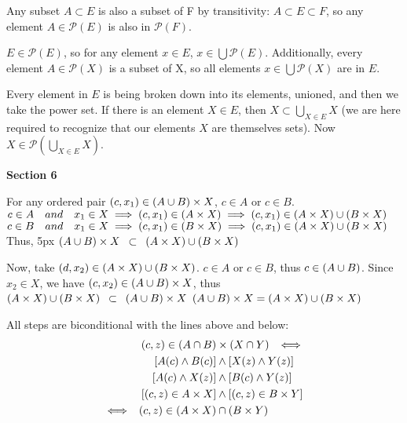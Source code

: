 \documentclass{article}
\DeclarePairedDelimiter\prn{(}{)}
\newcommand{\nl}[0]{\newline}
\newcommand{\rimp}[1][5]{\kern#1px \Longrightarrow \kern#1px}
\newcommand{\cimp}[1][5]{\kern#1px \iff \kern#1px}
\begin{document}
\begin{flushleft}
\fbox{$E \subset F \rimp \mathscr{P}(E) \subset \mathscr{P}(F)$} \nl
Any subset $A \subset E$ is also a subset of F by transitivity: $A \subset E \subset F$, so any element $A \in \mathscr{P}(E)$ is also in $\mathscr{P}(F)$. \nl

 \nl
$E \in \mathscr{P}(E)$, so for any element $x \in E$, $x \in \bigcup \mathscr{P}(E)$. Additionally, every element $A \in \mathscr{P}(X)$ is a subset of X, so all elements $x \in \bigcup \mathscr{P}(X)$ are in $E$. \nl

 \nl
Every element in $E$ is being broken down into its elements, unioned, and then we take the power set. If there is an element $X \in E$, then $X \subset \bigcup_{X \in E}X$ (we are here required to recognize that our elements $X$ are themselves sets). Now $X \in \mathscr{P}(\bigcup_{X \in E}X)$. \nl

\centerline{\textbf{Section 6}}

 \nl
For any ordered pair $(c, x_1) \in \prn*{A \cup B} \times X$, $c \in A$ or $c \in B$. \nl
\hspace*{50px}$c \in A \kern10px and \kern10px x_1 \in X \implies (c, x_1) \in \prn*{A \times X} \implies (c,x_1) \in \prn*{A \times X} \cup \prn*{B \times X}$ \nl
\hspace*{50px}$c \in B \kern10px and \kern10px x_1 \in X \implies (c, x_1) \in \prn*{B \times X} \implies (c,x_1) \in \prn*{A \times X} \cup \prn*{B \times X}$ \nl \nl
Thus, \kern5px $\prn*{A \cup B} \times X \kern5px \subset \kern5px \prn*{A \times X} \cup \prn*{B \times X}$ \nl

Now, take $(d, x_2) \in \prn*{A \times X} \cup \prn*{B \times X}$. $c \in A$ or $c \in B$, thus $c \in \prn*{A \cup B}$. \nl
Since $x_2 \in X$, we have $(c,x_2) \in \prn*{A \cup B} \times X$, thus \nl
$\prn*{A \times X} \cup \prn*{B \times X} \kern5px \subset \kern5px \prn*{A \cup B} \times X$ \nl
$\prn*{A \cup B} \times X = \prn*{A \times X} \cup \prn*{B \times X}$ \nl

 \nl
All steps are biconditional with the lines above and below:
$$\begin{aligned}
(c,z) \in \prn*{A \cap B} &\times \prn*{X \cap Y} \cimp \\
[A(c) \wedge B(c)] &\wedge [X(z) \wedge Y(z)] \\
[A(c) \wedge X(z)] &\wedge [B(c) \wedge Y(z)] \\
[(c,z) \in A \times X] &\wedge [(c,z) \in B \times Y] \\
\cimp (c,z) \in (A \times X) &\cap (B \times Y)
\end{aligned}$$


\end{flushleft}
\end{document}

